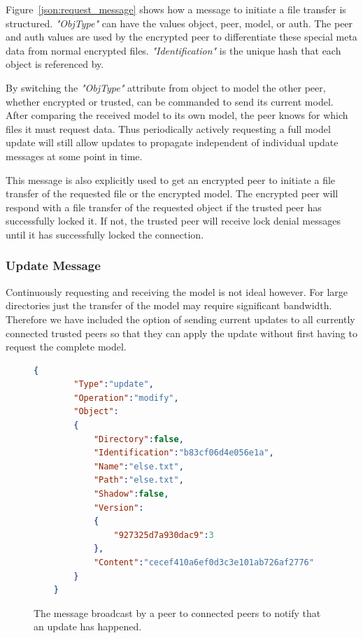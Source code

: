 Figure~\ref{json:request_message} shows how a message to initiate a file transfer is structured.
\textit{"ObjType"} can have the values object, peer, model, or auth.
The peer and auth values are used by the encrypted peer to differentiate these special meta data from normal encrypted files.
\textit{"Identification"} is the unique hash that each object is referenced by.

By switching the \textit{"ObjType"} attribute from object to model the other peer, whether encrypted or trusted, can be commanded to send its current model.
After comparing the received model to its own model, the peer knows for which files it must request data.
Thus periodically actively requesting a full model update will still allow updates to propagate independent of individual update messages at some point in time.

This message is also explicitly used to get an encrypted peer to initiate a file transfer of the requested file or the encrypted model.
The encrypted peer will respond with a file transfer of the requested object if the trusted peer has successfully locked it.
If not, the trusted peer will receive lock denial messages until it has successfully locked the connection.

\subsubsection{Update Message}
\label{subs:Update Message}

Continuously requesting and receiving the model is not ideal however.
For large directories just the transfer of the model may require significant bandwidth.
Therefore we have included the option of sending current updates to all currently connected trusted peers so that they can apply the update without first having to request the complete model.

\begin{figure}[htp]
    \begin{lstlisting}[language=json,firstnumber=0]
    {
        "Type":"update",
        "Operation":"modify",
        "Object":
        {
            "Directory":false,
            "Identification":"b83cf06d4e056e1a",
            "Name":"else.txt",
            "Path":"else.txt",
            "Shadow":false,
            "Version":
            {
                "927325d7a930dac9":3
            },
            "Content":"cecef410a6ef0d3c3e101ab726af2776"
        }
    }
    \end{lstlisting}
\caption[Update Object Message]{The message broadcast by a peer to connected peers to notify that an update has happened.}
\label{json:update_object}
\end{figure}

